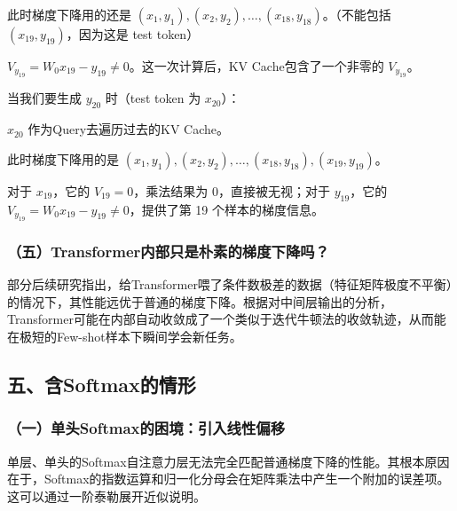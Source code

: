 此时梯度下降用的还是 \((x_1,y_1),(x_2,y_2),\ldots,(x_{18},y_{18})\)。（不能包括 \((x_{19},y_{19})\)，因为这是 test token）

\(V_{y_{19}}=W_0x_{19}-y_{19}\ne 0\)。这一次计算后，KV Cache包含了一个非零的 \(V_{y_{19}}\)。

当我们要生成 \(y_{20}\) 时（test token 为 \(x_{20}\)）：

\(x_{20}\) 作为Query去遍历过去的KV Cache。

此时梯度下降用的是 \((x_1,y_1),(x_2,y_2),\ldots,(x_{18},y_{18}),(x_{19},y_{19})\)。

对于 \(x_{19}\)，它的 \(V_{19}=0\)，乘法结果为 \(0\)，直接被无视；对于 \(y_{19}\)，它的 \(V_{y_{19}}=W_0x_{19}-y_{19}\ne 0\)，提供了第 19 个样本的梯度信息。

\hypertarget{ux4e94transformerux5185ux90e8ux53eaux662fux6734ux7d20ux7684ux68afux5ea6ux4e0bux964dux5417}{%
\subsubsection{（五）Transformer内部只是朴素的梯度下降吗？}\label{ux4e94transformerux5185ux90e8ux53eaux662fux6734ux7d20ux7684ux68afux5ea6ux4e0bux964dux5417}}

部分后续研究指出，给Transformer喂了条件数极差的数据（特征矩阵极度不平衡）的情况下，其性能远优于普通的梯度下降。根据对中间层输出的分析，Transformer可能在内部自动收敛成了一个类似于迭代牛顿法的收敛轨迹，从而能在极短的Few-shot样本下瞬间学会新任务。

\hypertarget{ux4e94ux542bsoftmaxux7684ux60c5ux5f62}{%
\subsection{五、含Softmax的情形}\label{ux4e94ux542bsoftmaxux7684ux60c5ux5f62}}

\hypertarget{ux4e00ux5355ux5934softmaxux7684ux56f0ux5883ux5f15ux5165ux7ebfux6027ux504fux79fb}{%
\subsubsection{（一）单头Softmax的困境：引入线性偏移}\label{ux4e00ux5355ux5934softmaxux7684ux56f0ux5883ux5f15ux5165ux7ebfux6027ux504fux79fb}}

单层、单头的Softmax自注意力层无法完全匹配普通梯度下降的性能。其根本原因在于，Softmax的指数运算和归一化分母会在矩阵乘法中产生一个附加的误差项。这可以通过一阶泰勒展开近似说明。

